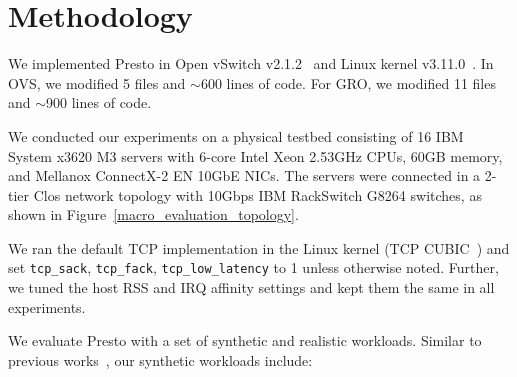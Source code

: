 \section{Methodology}
\label{sec:method}

We implemented Presto in Open vSwitch v2.1.2~\cite{ovs-website} and Linux kernel v3.11.0~\cite{kernel}.
In OVS, we modified 5 files and $\sim$600 lines of code. For GRO, we modified 11 files and $\sim$900 lines of code.




 We conducted our experiments on a physical
testbed consisting of 16 IBM System x3620 M3 servers with 6-core Intel Xeon
2.53GHz CPUs, 60GB memory, and Mellanox ConnectX-2 EN 10GbE NICs. 
The servers were connected in a 2-tier Clos network topology with 10Gbps
IBM RackSwitch G8264 switches, as shown in Figure~\ref{macro_evaluation_topology}.

We ran the default TCP implementation in the Linux kernel (TCP CUBIC~\cite{cubic})
and set {\tt tcp\_sack}, {\tt tcp\_fack}, {\tt tcp\_low\_latency} to 1 unless otherwise noted. 
Further, we tuned the host RSS and IRQ affinity settings and kept them the same in all experiments.

We evaluate Presto with a set of synthetic and realistic workloads. 
Similar to previous works~\cite{fattree,hedera,planck}, our synthetic workloads include:

